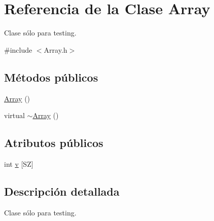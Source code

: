 \hypertarget{classArray}{
\section{\-Referencia de la \-Clase \-Array}
\label{classArray}
}


\-Clase sólo para testing.  




{\ttfamily \#include $<$\-Array.\-h$>$}

\subsection*{\-Métodos públicos}
\begin{DoxyCompactItemize}
\item 
\hyperlink{classArray_ae20b3dbb4aa6083679c0dea835abd861}{\-Array} ()
\item 
virtual \hyperlink{classArray_a66d3fee8e78097d35709028b3ba02803}{$\sim$\-Array} ()
\end{DoxyCompactItemize}
\subsection*{\-Atributos públicos}
\begin{DoxyCompactItemize}
\item 
int \hyperlink{classArray_a16929ec67ca1c38e4ac0fb74d0bfd864}{v} \mbox{[}\-S\-Z\mbox{]}
\end{DoxyCompactItemize}


\subsection{\-Descripción detallada}
\-Clase sólo para testing. 

